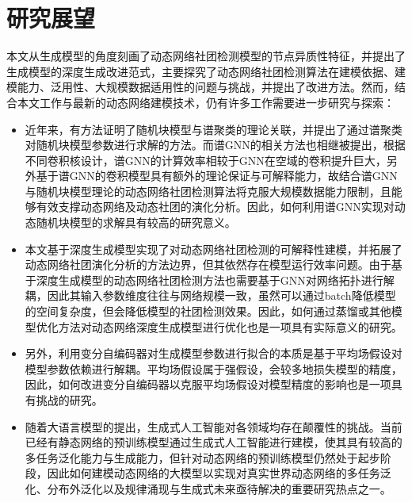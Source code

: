 \section{研究展望}

本文从生成模型的角度刻画了动态网络社团检测模型的节点异质性特征，并提出了生成模型的深度生成改进范式，主要探究了动态网络社团检测算法在建模依据、建模能力、泛用性、大规模数据适用性的问题与挑战，并提出了改进方法。然而，结合本文工作与最新的动态网络建模技术，仍有许多工作需要进一步研究与探索：

\begin{itemize}
	\item 近年来，有方法证明了随机块模型与谱聚类的理论关联\cite{keriven2022sparse}，并提出了通过谱聚类对随机块模型参数进行求解的方法。而谱GNN\cite{wang2022powerful}的相关方法也相继被提出，根据不同卷积核设计，谱GNN的计算效率相较于GNN在空域的卷积提升巨大，另外基于谱GNN的卷积模型具有额外的理论保证与可解释能力，故结合谱GNN与随机块模型理论的动态网络社团检测算法将克服大规模数据能力限制，且能够有效支撑动态网络及动态社团的演化分析。因此，如何利用谱GNN实现对动态随机块模型的求解具有较高的研究意义。
	\item 本文基于深度生成模型实现了对动态网络社团检测的可解释性建模，并拓展了动态网络社团演化分析的方法边界，但其依然存在模型运行效率问题。由于基于深度生成模型的动态网络社团检测方法也需要基于GNN对网络拓扑进行解耦，因此其输入参数维度往往与网络规模一致，虽然可以通过batch降低模型的空间复杂度，但会降低模型的社团检测效果。因此，如何通过蒸馏或其他模型优化方法对动态网络深度生成模型进行优化也是一项具有实际意义的研究。
	\item 另外，利用变分自编码器对生成模型参数进行拟合的本质是基于平均场假设对模型参数依赖进行解耦。平均场假设属于强假设，会较多地损失模型的精度，因此，如何改进变分自编码器以克服平均场假设对模型精度的影响也是一项具有挑战的研究。
    \item 随着大语言模型的提出，生成式人工智能对各领域均存在颠覆性的挑战。当前已经有静态网络的预训练模型通过生成式人工智能进行建模，使其具有较高的多任务泛化能力与生成能力，但针对动态网络的预训练模型仍然处于起步阶段，因此如何建模动态网络的大模型以实现对真实世界动态网络的多任务泛化、分布外泛化以及规律涌现与生成式未来亟待解决的重要研究热点之一。
\end{itemize}




